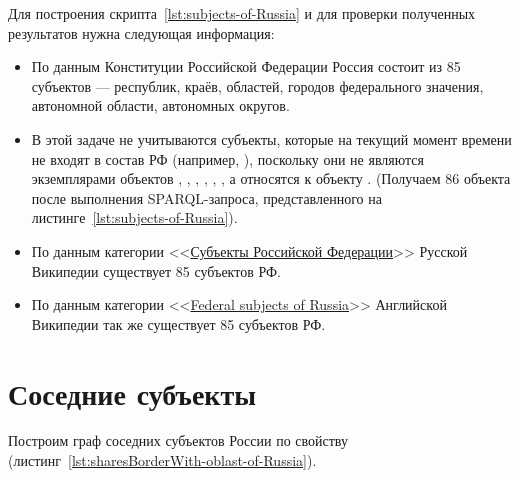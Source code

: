 Для построения скрипта~\protect\ref{lst:subjects-of-Russia} и для проверки полученных результатов нужна следующая информация:
\begin{itemize}
  \item По данным Конституции Российской Федерации Россия состоит из 85 субъектов — республик, краёв, областей, городов федерального значения, автономной области, автономных округов.
  \item В этой задаче не учитываются субъекты, которые на текущий момент времени не входят в состав РФ (например, ), поскольку они не являются экземплярами объектов , , , , , , а относятся к объекту . (Получаем 86 объекта после выполнения SPARQL-запроса, представленного на листинге~\protect\ref{lst:subjects-of-Russia}). 
  \item По данным категории <<\href{https://ru.wikipedia.org/wiki/Субъекты_Российской_Федерации}{Субъекты Российской Федерации}>> Русской Википедии существует 85 субъектов РФ.
  \item По данным категории <<\href{https://ru.wikipedia.org/wiki/en:Federal_subjects_of_Russia}{Federal subjects of Russia}>> Английской Википедии так же существует 85 субъектов РФ.
\end{itemize}


\section{Соседние субъекты}

Построим граф соседних субъектов России по свойству  (листинг~\protect\ref{lst:sharesBorderWith-oblast-of-Russia}).

